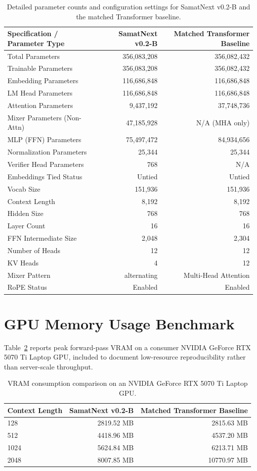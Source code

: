 \documentclass[11pt,a4paper]{article}
\begin{document}
\begin{table}[h]
\centering
\begin{tabular}{lrr}
\toprule
Specification / Parameter Type & SamatNext v0.2-B & Matched Transformer Baseline \\
\midrule
Total Parameters & 356,083,208 & 356,082,432 \\
Trainable Parameters & 356,083,208 & 356,082,432 \\
Embedding Parameters & 116,686,848 & 116,686,848 \\
LM Head Parameters & 116,686,848 & 116,686,848 \\
Attention Parameters & 9,437,192 & 37,748,736 \\
Mixer Parameters (Non-Attn) & 47,185,928 & N/A (MHA only) \\
MLP (FFN) Parameters & 75,497,472 & 84,934,656 \\
Normalization Parameters & 25,344 & 25,344 \\
Verifier Head Parameters & 768 & N/A \\
Embeddings Tied Status & Untied & Untied \\
Vocab Size & 151,936 & 151,936 \\
Context Length & 8,192 & 8,192 \\
Hidden Size & 768 & 768 \\
Layer Count & 16 & 16 \\
FFN Intermediate Size & 2,048 & 2,304 \\
Number of Heads & 12 & 12 \\
KV Heads & 4 & 12 \\
Mixer Pattern & alternating & Multi-Head Attention \\
RoPE Status & Enabled & Enabled \\
\bottomrule
\end{tabular}
\caption{Detailed parameter counts and configuration settings for SamatNext v0.2-B and the matched Transformer baseline.}
\label{tab:param_spec_app}
\end{table}

\section{GPU Memory Usage Benchmark}
Table~\ref{tab:vram_spec_app} reports peak forward-pass VRAM on a consumer NVIDIA GeForce RTX 5070 Ti Laptop GPU, included to document low-resource reproducibility rather than server-scale throughput.

\begin{table}[h]
\centering
\begin{tabular}{lrr}
\toprule
Context Length & SamatNext v0.2-B & Matched Transformer Baseline \\
\midrule
128 & 2819.52 MB & 2815.63 MB \\
512 & 4418.96 MB & 4537.20 MB \\
1024 & 5624.84 MB & 6213.71 MB \\
2048 & 8007.85 MB & 10770.97 MB \\
\bottomrule
\end{tabular}
\caption{VRAM consumption comparison on an NVIDIA GeForce RTX 5070 Ti Laptop GPU.}
\label{tab:vram_spec_app}
\end{table}
\end{document}
